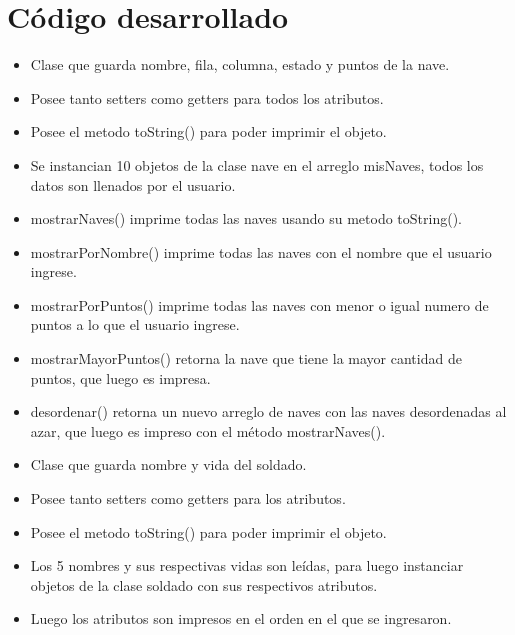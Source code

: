 \documentclass{article}
\begin{document}
\section{Código desarrollado}

\begin{itemize}
	\item Clase que guarda nombre, fila, columna, estado y puntos de la nave.
	\item Posee tanto setters como getters para todos los atributos.
	\item Posee el metodo toString() para poder imprimir el objeto.
\end{itemize}
\pagebreak

\begin{itemize}
	\item Se instancian 10 objetos de la clase nave en el arreglo misNaves, todos los datos son llenados por el usuario.
	\item mostrarNaves() imprime todas las naves usando su metodo toString().
	\item mostrarPorNombre() imprime todas las naves con el nombre que el usuario ingrese.
	\item mostrarPorPuntos() imprime todas las naves con menor o igual numero de puntos a lo que el usuario ingrese.
	\item mostrarMayorPuntos() retorna la nave que tiene la mayor cantidad de puntos, que luego es impresa.
	\item desordenar() retorna un nuevo arreglo de naves con las naves desordenadas al azar, que luego es impreso con el método mostrarNaves().
\end{itemize}
\pagebreak

\begin{itemize}
	\item Clase que guarda nombre y vida del soldado.
	\item Posee tanto setters como getters para los atributos.
	\item Posee el metodo toString() para poder imprimir el objeto.
\end{itemize}
\pagebreak

\begin{itemize}
	\item Los 5 nombres y sus respectivas vidas son leídas, para luego instanciar objetos de la clase soldado con sus respectivos atributos.
	\item Luego los atributos son impresos en el orden en el que se ingresaron.
\end{itemize}
\end{document}
